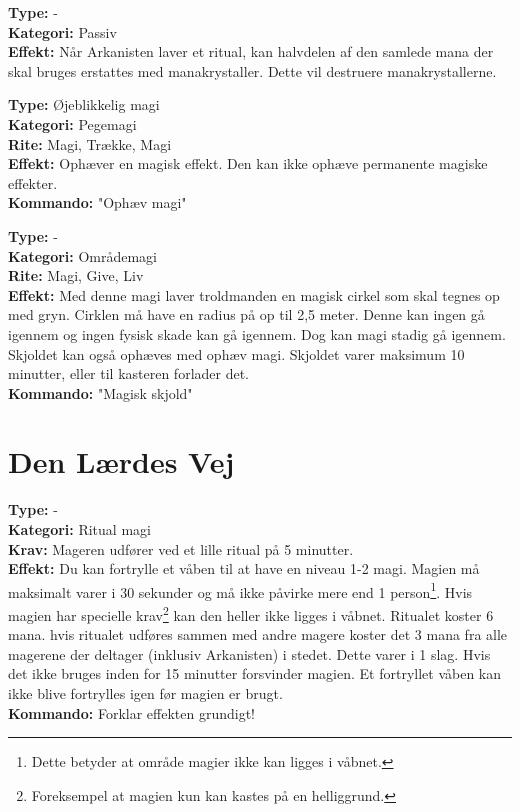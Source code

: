 \begin{primærMagi*}
\textbf{Type:} -\\
\textbf{Kategori:} Passiv\\
\textbf{Effekt:} Når Arkanisten laver et ritual, kan halvdelen af den samlede mana der skal bruges erstattes med manakrystaller. Dette vil destruere manakrystallerne.
\end{primærMagi*}

\begin{primærMagi*}
\textbf{Type:} Øjeblikkelig magi\\
\textbf{Kategori:} Pegemagi\\
\textbf{Rite:} Magi, Trække, Magi\\
\textbf{Effekt:} Ophæver en magisk effekt. Den kan ikke ophæve permanente magiske effekter.\\ 
\textbf{Kommando:} "Ophæv magi"
\end{primærMagi*}

\begin{primærMagi*}
\textbf{Type:} -\\
\textbf{Kategori:} Områdemagi \\
\textbf{Rite:} Magi, Give, Liv \\
\textbf{Effekt:} Med denne magi laver troldmanden en magisk cirkel som skal tegnes op med gryn. Cirklen må have
en radius på op til 2,5 meter. Denne kan ingen gå igennem og ingen fysisk skade kan gå igennem. Dog kan magi stadig gå igennem. Skjoldet kan også ophæves med ophæv magi. Skjoldet varer maksimum 10 minutter, eller til kasteren forlader det. \\
\textbf{Kommando:} "Magisk skjold"
\end{primærMagi*}

\section*{Den Lærdes Vej}
\begin{lærdMagi*}
\textbf{Type:} - \\
\textbf{Kategori:} Ritual magi\\
\textbf{Krav:} Mageren udfører ved et lille ritual på 5 minutter.\\
\textbf{Effekt:} Du kan fortrylle et våben til at have en niveau 1-2 magi. Magien må maksimalt varer i 30 sekunder og må ikke påvirke mere end 1 person\footnote{Dette betyder at område magier ikke kan ligges i våbnet.}. Hvis magien har specielle krav\footnote{Foreksempel at magien kun kan kastes på en helliggrund.} kan den heller ikke ligges i våbnet. Ritualet koster 6 mana. hvis ritualet udføres sammen med andre magere koster det 3 mana fra alle magerene der deltager (inklusiv Arkanisten) i stedet. Dette varer i 1 slag. Hvis det ikke bruges inden for 15 minutter forsvinder magien. Et fortryllet våben kan ikke blive fortrylles igen før magien er brugt.\\
\textbf{Kommando:} Forklar effekten grundigt!\\
\end{lærdMagi*}

